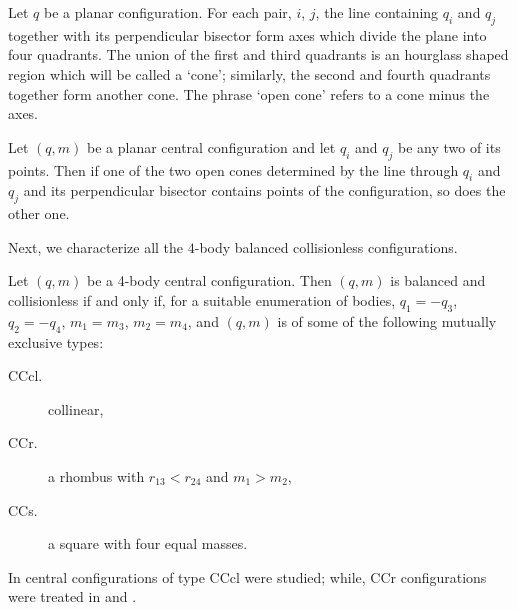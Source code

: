 \documentclass[smallcondensed]{svjour3}
\begin{document}
\begin{definition}\label{def:bis.per}
Let $q$ be a planar configuration. For each pair, $i$, $j$, the line
containing $q_i$ and $q_j$ together with its perpendicular bisector form axes which
divide the plane into four quadrants. The union of the first and third quadrants
is an hourglass shaped region which will be called a `cone'; similarly,
the second and fourth quadrants together form another cone. The phrase `open
cone' refers to a cone minus the axes.
\end{definition}

\begin{theorem}\label{thm:bisector.moeckel}
Let $(q,m)$ be a planar central configuration and let
$q_i$ and $q_j$ be any two of its points. Then if one of the two open cones determined
by the line through $q_i$ and $q_j$ and its perpendicular bisector contains points of
the configuration, so does the other one.
\end{theorem}

Next, we characterize all the $4$-body balanced collisionless configurations.

\begin{theorem}\label{thm:caracterizacion4}
Let $(q,m)$ be a 4-body central configuration. Then $(q,m)$ is  balanced and collisionless if and only if,  for a suitable enumeration  of bodies,   $q_1=-q_3$, $q_2=-q_4$, $m_1=m_3$,  $m_2=m_4$, and  $(q,m)$ is of some of the following mutually exclusive types:
\begin{description}
\item[CCcl.]   collinear,
\item[CCr.]  a rhombus with $r_{13}<r_{24}$ and $m_1>m_2$,
\item[CCs.]  a square with four equal masses.
\end{description}
\end{theorem}




\begin{remark} In \cite{shoaib2011collinear}  central configurations of type CCcl were studied; while,  CCr configurations were treated in \cite{long2002four} and \cite{perez2007convex}.

\end{remark}
\end{document}
